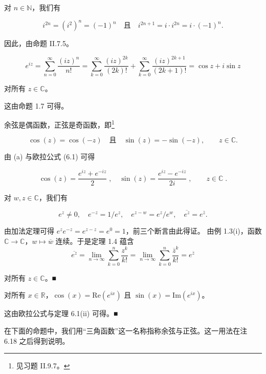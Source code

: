 \begin{theorem}
\begin{subitems}
对 $ n \in \mathbb{N} $，我们有

\[
i^{2n}=(i^{2})^{n}=(-1)^{n}\quad\text{且}\quad i^{2n+1}=i\cdot i^{2n}=i\cdot(-1)^{n}.
\]

因此，由命题 II.7.5。

\[
e^{i z}=\sum_{n=0}^{\infty}\frac{(i z)^{n}}{n!}=\sum_{k=0}^{\infty}\frac{(i z)^{2k}}{(2k)!}+\sum_{k=0}^{\infty}\frac{(i z)^{2k+1}}{(2k+1)!}=\cos z+i\sin z
\]

对所有 $ z \in \mathbb{C} $。

\item[（v）]

这由命题 1.7 可得。

\end{subitems}

\end{theorem}

\begin{remark}

\begin{items}
\item

余弦是偶函数，正弦是奇函数，即\footnote{见习题 II.9.7。}

\begin{equation}
\cos(z)=\cos(-z)\quad\text{且}\quad\sin(z)=-\sin(-z),\qquad z\in\mathbb{C}.
\end{equation}
\item

由 (a) 与欧拉公式 (6.1) 可得

\begin{equation}
\cos(z)=\frac{e^{i z}+e^{-i z}}{2}\;,\quad\sin(z)=\frac{e^{i z}-e^{-i z}}{2i}\;,\qquad z\in\mathbb{C}\;.
\end{equation}
\item

对 $ w, z \in \mathbb{C} $，我们有

\[
e^{z}\neq0,\quad e^{-z}=1/e^{z},\quad e^{z-w}=e^{z}/e^{w},\quad\overline{{e^{z}}}=e^{\overline{{z}}}.
\]

\proofhead
由加法定理可得 $ e^z e^{-z} = e^{z-z} = e^0 = 1 $，前三个断言由此得证。
由例 1.3(i)，函数 $\mathbb{C} \to \mathbb{C}$，$w \mapsto \overline{w}$ 连续。于是定理 1.4 蕴含
\[
\overline{e^{z}}=\lim_{n\to\infty}\sum_{k=0}^{n}\frac{z^{k}}{k!}=\lim_{n\to\infty}\sum_{k=0}^{n}\frac{\overline{z}^{k}}{k!}=e^{\overline{z}}
\]

对所有 $ z \in \mathbb{C} $。■

\item

对所有 $ x \in \mathbb{R} $，$ \cos(x) = \mathrm{Re}(e^{ix}) $ 且 $ \sin(x) = \mathrm{Im}(e^{ix}) $。

\proofhead
这由欧拉公式与定理 6.1(ii) 可得。■
\end{items}

在下面的命题中，我们用“三角函数”这一名称指称余弦与正弦。这一用法在注 6.18 之后得到说明。

\end{remark}

